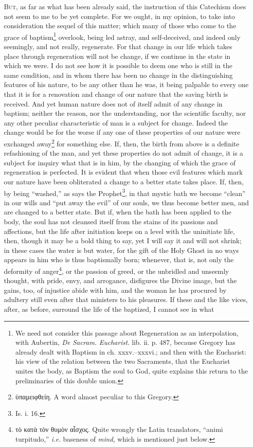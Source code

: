 
\textsc{But}, as far as what has been already said, the instruction of this Catechism does not seem to me to be yet complete. For we ought, in my opinion, to take into consideration the sequel of this matter; which many of those who come to the grace of baptism\footnote{We need not consider this passage about Regeneration as an interpolation, with Aubertin, \emph{De Sacram. Eucharist.} lib. ii. p. 487, because Gregory has already dealt with Baptism in ch. xxxv.–xxxvi.; and then with the Eucharist: his view of the relation between the two Sacraments, that the Eucharist unites the body, as Baptism the soul to God, quite explains this return to the preliminaries of this double union.} overlook, being led astray, and self-deceived, and indeed only seemingly, and not really, regenerate. For that change in our life which takes place through regeneration will not be change, if we continue in the state in which we were. I do not see how it is possible to deem one who is still in the same condition, and in whom there has been no change in the distinguishing features of his nature, to be any other than he was, it being palpable to every one that it is for a renovation and change of our nature that the saving birth is received. And yet human nature does not of itself admit of any change in baptism; neither the reason, nor the understanding, nor the scientific faculty, nor any other peculiar characteristic of man is a subject for change. Indeed the change would be for the worse if any one of these properties of our nature were exchanged away\footnote{\textgreek{ὑπαμειφθείη}. A word almost peculiar to this Gregory.} for something else. If, then, the birth from above is a definite refashioning of the man, and yet these properties do not admit of change, it is a subject for inquiry what that is in him, by the changing of which the grace of regeneration is perfected. It is evident that when those evil features which mark our nature have been obliterated a change to a better state takes place. If, then, by being “washed,” as says the Prophet\footnote{Is. i. 16.}, in that mystic bath we become “clean” in our wills and “put away the evil” of our souls, we thus become better men, and are changed to a better state. But if, when the bath has been applied to the body, the soul has not cleansed itself from the stains of its passions and affections, but the life after initiation keeps on a level with the uninitiate life, then, though it may be a bold thing to say, yet I will say it and will not shrink; in these cases the water is but water, for the gift of the Holy Ghost in no ways appears in him who is thus baptismally born; whenever, that is, not only the deformity of anger\footnote{\textgreek{τὸ κατὰ τὸν θυμὸν αἶσχος}. Quite wrongly the Latin translators, “animi turpitudo,” \emph{i.e.} baseness of \emph{mind,} which is mentioned just below.}, or the passion of greed, or the unbridled and unseemly thought, with pride, envy, and arrogance, disfigures the Divine image, but the gains, too, of injustice abide with him, and the woman he has procured by adultery still even after that ministers to his pleasures. If these and the like vices, after, as before, surround the life of the baptized, I cannot see in what 